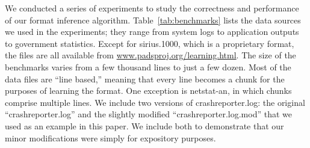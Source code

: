 We conducted a series of experiments to study the correctness
and performance of our format inference algorithm.
Table~\ref{tab:benchmarks} lists the data sources we used in the experiments;
they range from system logs to application outputs to government
statistics. Except for sirius.1000, which is a proprietary format, the files 
are all available from \url{www.padsproj.org/learning.html}.
The size of the benchmarks varies from a few thousand lines to just a
few dozen.
Most of the data files are ``line based,'' meaning that every line becomes a chunk
for the purposes of learning the format.  One exception is netstat-an, in which
chunks comprise multiple lines.
We include two versions of crashreporter.log: the original
``crashreporter.log'' and the slightly modified ``crashreporter.log.mod'' 
that we used as an example in this paper.  We include both to 
demonstrate that our minor modifications were simply for expository purposes.


